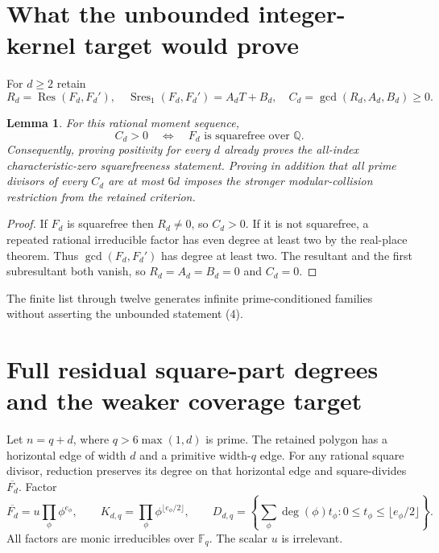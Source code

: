 \documentclass[11pt]{article}
\newtheorem{lemma}[theorem]{Lemma}
\newcommand{\Q}{\mathbb Q}
\newcommand{\F}{\mathbb F}
\begin{document}
\section{What the unbounded integer-kernel target would prove}
For $d\ge2$ retain
\[
 R_d=\operatorname{Res}(F_d,F_d'),\quad
 \operatorname{Sres}_1(F_d,F_d')=A_dT+B_d,\quad
 C_d=\gcd(R_d,A_d,B_d)\ge0.
\]
\begin{lemma}\label{lem:strength}
For this rational moment sequence,
\[
 C_d>0\quad\Longleftrightarrow\quad F_d\text{ is squarefree over }\Q.
 \tag{4}
\]
Consequently, proving positivity for every $d$ already proves the
all-index characteristic-zero squarefreeness statement. Proving in
addition that all prime divisors of every $C_d$ are at most $6d$ imposes
the stronger modular-collision restriction from the retained criterion.
\end{lemma}
\begin{proof}
If $F_d$ is squarefree then $R_d\ne0$, so $C_d>0$.
If it is not squarefree, a repeated rational irreducible factor has
even degree at least two by the real-place theorem. Thus
$\gcd(F_d,F_d')$ has degree at least two. The resultant and the
first subresultant both vanish, so $R_d=A_d=B_d=0$ and $C_d=0$.
\end{proof}
The finite list through twelve generates infinite prime-conditioned
families without asserting the unbounded statement (4).

\section{Full residual square-part degrees and the weaker coverage target}
Let $n=q+d$, where $q>6\max(1,d)$ is prime. The retained polygon
has a horizontal edge of width $d$ and a primitive width-$q$ edge.
For any rational square divisor, reduction preserves its degree on
that horizontal edge and square-divides $\overline{F_d}$.
Factor
\[
 \overline{F_d}=u\prod_\phi\phi^{e_\phi},\qquad
 K_{d,q}=\prod_\phi\phi^{\lfloor e_\phi/2\rfloor},
 \qquad
 D_{d,q}=\left\{\sum_\phi\deg(\phi)t_\phi:
 0\le t_\phi\le\lfloor e_\phi/2\rfloor\right\}. \tag{5}
\]
All factors are monic irreducibles over $\F_q$. The scalar $u$ is irrelevant.
\end{document}
